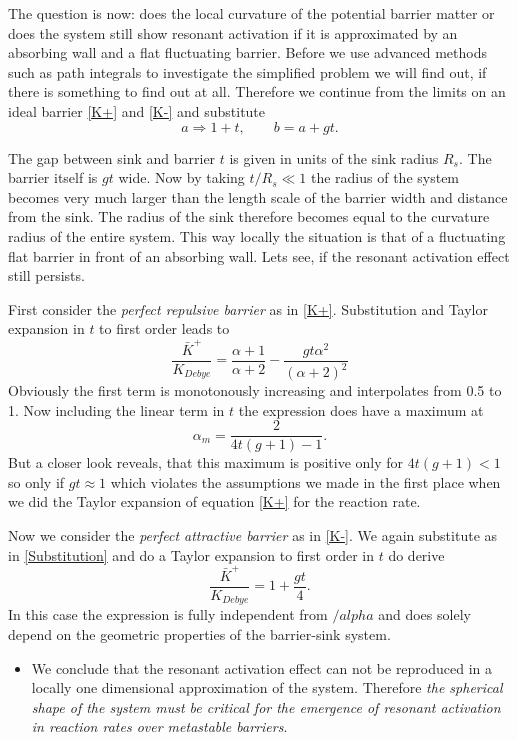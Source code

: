 The question is now: does the local curvature of the potential barrier matter or does the system still show resonant activation if it is approximated by an absorbing wall and a flat fluctuating barrier.
Before we use advanced methods such as path integrals to investigate the simplified problem we will find out, if there is something to find out at all.
Therefore we continue from the limits on an ideal barrier \eqref{K+} and \eqref{K-} and substitute
\begin{equation}
    a \Rightarrow 1+t, \qquad b = a + gt.
    \label{Substitution}
\end{equation}
\par
The gap between sink and barrier $t$ is given in units of the sink radius $R_s$. The barrier itself is $gt$ wide. Now by taking $t/R_s \ll 1$ the radius of the system becomes very much larger than the length scale of the barrier width and distance from the sink. The radius of the sink therefore becomes equal to the curvature radius of the entire system. This way locally the situation is that of a fluctuating flat barrier in front of an absorbing wall. Lets see, if the resonant activation effect still persists.
\par
First consider the \textit{perfect repulsive barrier} as in \eqref{K+}. Substitution and Taylor expansion in $t$ to first order leads to
\begin{equation}
    \frac{\bar{K}^{+}}{K_{Debye}} = \frac{\alpha+1}{\alpha+2}-\frac{g t \alpha^2}{(\alpha+2)^2} 
    \label{K+linear}
\end{equation}
Obviously the first term is monotonously increasing and interpolates from 0.5 to 1. Now including the linear term in $t$ the expression does have a maximum at
\begin{equation}
    \alpha_m = \frac{2}{4t(g+1) - 1}.
    \label{alpham+}
\end{equation}
But a closer look reveals, that this maximum is positive only for $4t(g+1) < 1$ so only if $gt \approx 1$ which violates the assumptions we made in the first place when we did the Taylor expansion of equation \eqref{K+} for the reaction rate. 
\par
Now we consider the \textit{perfect attractive barrier} as in \eqref{K-}. We again substitute as in \eqref{Substitution} and do a Taylor expansion to first order in $t$ do derive
\begin{equation}
    \frac{\bar{K}^{+}}{K_{Debye}} = 1+\frac{g t}{4}.
    \label{K-linear}
\end{equation}
In this case the expression is fully independent from $/alpha$ and does solely depend on the geometric properties of the barrier-sink system.
\par
\begin{itemize}
    \item We conclude that the resonant activation effect can not be reproduced in a locally one dimensional approximation of the system. Therefore \textit{the spherical shape of the system must be critical for the emergence of resonant activation in reaction rates over metastable barriers}.
\end{itemize}
